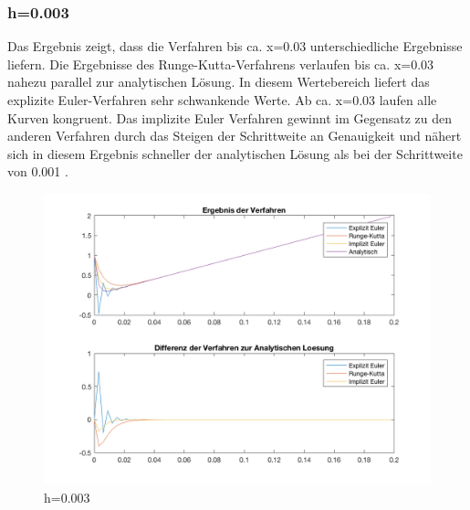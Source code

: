 \documentclass[]{scrartcl}
\begin{document}
\subsubsection{h=0.003}
Das Ergebnis zeigt, dass die Verfahren bis ca. x=0.03 unterschiedliche Ergebnisse liefern. Die Ergebnisse des Runge-Kutta-Verfahrens verlaufen bis ca. x=0.03 nahezu parallel zur analytischen Lösung. In diesem Wertebereich liefert das explizite Euler-Verfahren sehr schwankende Werte. Ab ca. x=0.03 laufen alle Kurven kongruent. Das implizite Euler Verfahren gewinnt im Gegensatz zu den anderen Verfahren durch das Steigen der Schrittweite an Genauigkeit und nähert sich in diesem Ergebnis schneller der analytischen Lösung als bei der Schrittweite von 0.001 .
\begin{figure}[H]
	\centering
	\includegraphics[width=1\linewidth]{a1_1_2}
	\caption{h=0.003}
	\label{fig:a1_1_2}
\end{figure}
\end{document}
